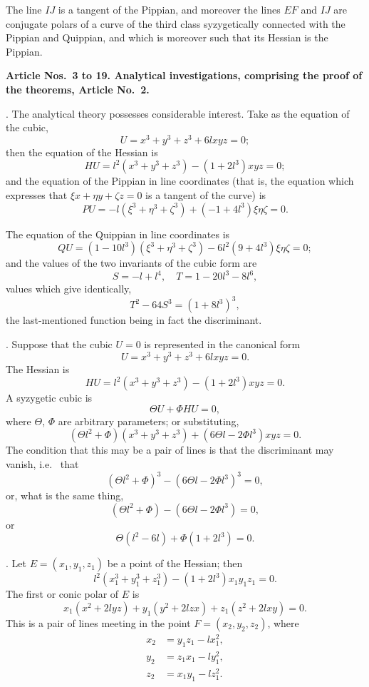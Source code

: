 \documentclass[12pt,a4paper]{article}
\theoremstyle{definition}
\newcommand{\ie}{i.e.\ }
\begin{document}
The line $IJ$ is a tangent of the Pippian, and moreover the
lines $EF$ and $IJ$ are conjugate polars of a curve of the third
class syzygetically connected with the Pippian and Quippian,
and which is moreover such that its Hessian is the Pippian.

\medskip\noindent\textbf{Article Nos.~3 to 19. Analytical investigations, comprising
the proof of the theorems, Article No.~2.}

. The analytical theory possesses considerable interest.
Take as the equation of the cubic,
\[
U = x^{3} + y^{3} + z^{3} + 6lxyz = 0;
\]
then the equation of the Hessian is
\[
HU = l^{2}(x^{3} + y^{3} + z^{3}) - (1 + 2l^{3})xyz = 0;
\]
and the equation of the Pippian in line coordinates (that is,
the equation which expresses that $\xi x + \eta y + \zeta z = 0$
is a tangent of the curve) is
\[
PU = -l(\xi^{3} + \eta^{3} + \zeta^{3}) + (-1 + 4l^{3})\xi\eta\zeta = 0.
\]

The equation of the Quippian in line coordinates is
\[
QU = (1 - 10l^{3})(\xi^{3} + \eta^{3} + \zeta^{3}) - 6l^{2}(9 + 4l^{3})\xi\eta\zeta = 0;
\]
and the values of the two invariants of the cubic form are
\[
S = -l + l^{4}, \quad T = 1 - 20l^{3} - 8l^{6},
\]
values which give identically,
\[
T^{2} - 64S^{3} = (1 + 8l^{3})^{3},
\]
the last-mentioned function being in fact the discriminant.

. Suppose that the cubic $U = 0$ is represented in the
canonical form
\[
U = x^{3} + y^{3} + z^{3} + 6lxyz = 0.
\]
The Hessian is
\[
HU = l^{2}(x^{3} + y^{3} + z^{3}) - (1 + 2l^{3})xyz = 0.
\]
A syzygetic cubic is
\[
\Theta U + \Phi HU = 0,
\]
where $\Theta$, $\Phi$ are arbitrary parameters; or substituting,
\[
(\Theta l^{2} + \Phi)(x^{3} + y^{3} + z^{3}) + (6\Theta l - 2\Phi l^{3})xyz = 0.
\]
The condition that this may be a pair of lines is that the
discriminant may vanish, \ie{} that
\[
(\Theta l^{2} + \Phi)^{3} - (6\Theta l - 2\Phi l^{3})^{3} = 0,
\]
or, what is the same thing,
\[
(\Theta l^{2} + \Phi) - (6\Theta l - 2\Phi l^{3}) = 0,
\]
or
\[
\Theta(l^{2} - 6l) + \Phi(1 + 2l^{3}) = 0.
\]

. Let $E = (x_{1}, y_{1}, z_{1})$ be a point of the Hessian; then
\[
l^{2}(x_{1}^{3} + y_{1}^{3} + z_{1}^{3}) - (1 + 2l^{3})x_{1}y_{1}z_{1} = 0.
\]
The first or conic polar of $E$ is
\[
x_{1}(x^{2} + 2lyz) + y_{1}(y^{2} + 2lzx) + z_{1}(z^{2} + 2lxy) = 0.
\]
This is a pair of lines meeting in the point $F = (x_{2}, y_{2}, z_{2})$,
where
\begin{align*}
x_{2} &= y_{1}z_{1} - lx_{1}^{2}, \\
y_{2} &= z_{1}x_{1} - ly_{1}^{2}, \\
z_{2} &= x_{1}y_{1} - lz_{1}^{2}.
\end{align*}
\end{document}
